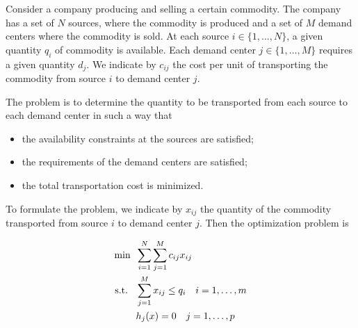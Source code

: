\documentclass[10pt,a4paper]{article}
\begin{document}
\begin{example}
Consider a company producing and selling a certain commodity. The company has a set of $N$ sources, where the commodity is produced and a set of $M$ demand centers where the commodity is sold. At each source $i \in \{1, \dots, N\}$, a given quantity $q_i$ of commodity is available. Each demand center $j \in \{1, \dots, M\}$ requires a given quantity $d_j$. We indicate by $c_{ij}$ the cost per unit of transporting the commodity from source $i$ to demand center $j$.

\par The problem is to determine the quantity to be transported from each source to
each demand center in such a way that
\begin{itemize}
	\item the availability constraints at the sources are satisfied;
	\item the requirements of the demand centers are satisfied;
	\item the total transportation cost is minimized.
\end{itemize}
To formulate the problem, we indicate by $x_{ij}$ the quantity of the commodity transported from source $i$ to demand center $j$. Then the optimization problem is

\begin{equation*}
	\begin{split}
		\min \;\; &\sum_{i=1}^{N}\sum_{j=1}^{M}c_{ij}x_{ij}\\
		\text{s.t.} \;\;\;&\sum_{j=1}^{M}x_{ij} \leq q_i\quad i=1, \dots, m\\
		& h_j(x) = 0 \quad j=1, \dots, p
	\end{split}
\end{equation*}
\end{example}
\end{document}
